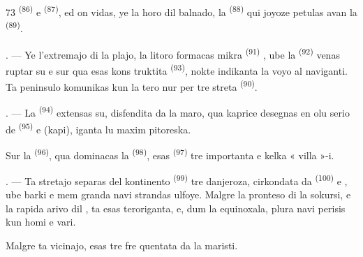 \begin{VUpage}[75]{73}
\VUcontinue
{} \textsuperscript{(86)} e  \textsuperscript{(87)}, ed on vidas, ye la horo\nl
dil balnado, la  \textsuperscript{(88)} qui joyoze petulas\nl
avan la  \textsuperscript{(89)}.

. --- Ye l'extremajo di la plajo, la litoro\nl
formacas mikra  \textsuperscript{(91)} , ube la\nl
{} \textsuperscript{(92)} venas ruptar su e sur qua esas kons\cc
truktita  \textsuperscript{(93)}, nokte indikanta la voyo al\nl
naviganti. Ta peninsulo komunikas kun la\nl
tero nur per  tre streta \textsuperscript{(90)}.

\VUsaut{3.0mm}
\VUsaut{3.0mm}

. --- La  \textsuperscript{(94)} extensas su, disfendita\nl
da la maro, qua kaprice desegnas en olu serio\nl
de  \textsuperscript{(95)} e  (kapi), iganta lu\nl
maxim pitoreska.

\VUblancAlinea
Sur la  \textsuperscript{(96)}, qua dominacas la \cc
{} \textsuperscript{(98)}, esas  \textsuperscript{(97)} tre importanta e\nl
kelka « villa »-i.

. --- Ta stretajo separas del kontinento \cc
{} \textsuperscript{(99)} tre danjeroza, cirkondata da  \textsuperscript{(100)} e\nl
{}, ube barki e mem granda navi strandas\nl
ulfoye. Malgre la pronteso di la sokursi, e la\nl
rapida arivo dil , ta  esas\nl
teroriganta, e, dum la  equinoxala,\nl
plura navi perisis kun homi e vari.

\VUblancAlinea
Malgre ta vicinajo,  esas tre fre\cc
quentata da la maristi.

\VUsaut{6.0mm}
\VUfilet{22mm}
\end{VUpage}

